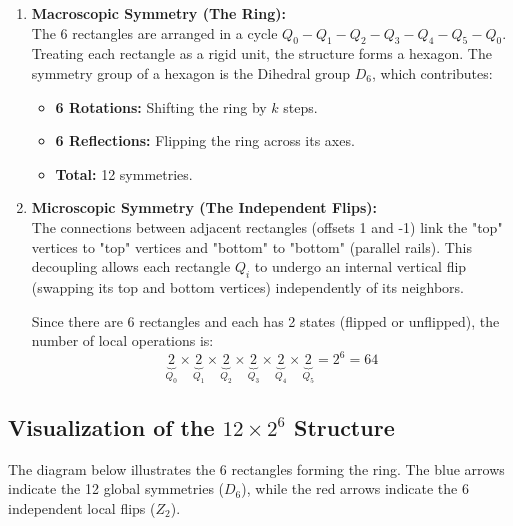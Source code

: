 \documentclass[12pt,letterpaper]{amsart}
\begin{document}
\begin{enumerate}
    \item \textbf{Macroscopic Symmetry (The Ring):} \\
    The 6 rectangles are arranged in a cycle $Q_0 - Q_1 - Q_2 - Q_3 - Q_4 - Q_5 - Q_0$. Treating each rectangle as a rigid unit, the structure forms a hexagon. The symmetry group of a hexagon is the Dihedral group $D_6$, which contributes:
    \begin{itemize}
        \item \textbf{6 Rotations:} Shifting the ring by $k$ steps.
        \item \textbf{6 Reflections:} Flipping the ring across its axes.
        \item \textbf{Total:} 12 symmetries.
    \end{itemize}

    \item \textbf{Microscopic Symmetry (The Independent Flips):} \\
    The connections between adjacent rectangles (offsets 1 and -1) link the "top" vertices to "top" vertices and "bottom" to "bottom" (parallel rails). This decoupling allows each rectangle $Q_i$ to undergo an internal vertical flip (swapping its top and bottom vertices) independently of its neighbors.
    
    Since there are 6 rectangles and each has 2 states (flipped or unflipped), the number of local operations is:
    $$ \underbrace{2}_{Q_0} \times \underbrace{2}_{Q_1} \times \underbrace{2}_{Q_2} \times \underbrace{2}_{Q_3} \times \underbrace{2}_{Q_4} \times \underbrace{2}_{Q_5} = 2^6 = 64 $$
\end{enumerate}

\vspace{1cm}

\subsection*{Visualization of the $12 \times 2^6$ Structure}
The diagram below illustrates the 6 rectangles forming the ring. The blue arrows indicate the 12 global symmetries ($D_6$), while the red arrows indicate the 6 independent local flips ($Z_2$).
\end{document}
